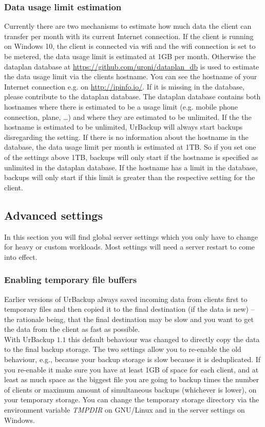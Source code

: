 \documentclass[a4paper,10pt]{article}
\begin{document}
\subsubsection{Data usage limit estimation}
\label{estimate_dataplan}

Currently there are two mechanisms to estimate how much data the client can transfer per month with its current Internet connection. If the client is running on Windows 10, the client is connected via wifi and the wifi connection is set to be metered, the data usage limit is estimated at 1GB per month.
Otherwise the dataplan database at \url{https://github.com/uroni/dataplan_db} is used to estimate the data usage limit via the clients hostname. You can see the hostname of your Internet connection e.g. on \url{http://ipinfo.io/}. If it is missing in the database, please contribute to the dataplan database.
The dataplan database contains both hostnames where there is estimated to be a usage limit (e.g. mobile phone connection, plane, \ldots) and where they are estimated to be unlimited.
If the the hostname is estimated to be unlimited, UrBackup will always start backups disregarding the setting. If there is no information about the hostname in the database, the data usage limit per month is estimated at 1TB. So if you set one of the settings above 1TB, backups will only start if the hostname is specified as unlimited in the dataplan database. If the hostname has a limit in the database, backups will only start if this limit is greater than the respective setting for the client. 

\subsection{Advanced settings}

In this section you will find global server settings which you only have to
change for heavy or custom workloads. Most settings will need a server restart
to come into effect.

\subsubsection{Enabling temporary file buffers}
\label{temp_file_buffers}

Earlier versions of UrBackup always saved incoming data from clients first to temporary
files and then copied it to the final destination (if the data is new) -- the rationale
being, that the final destination may be slow and you want to get the data from the client
as fast as possible.\\
With UrBackup $1.1$ this default behaviour was changed to directly copy the data to the
final backup storage. The two settings allow you to re-enable the old behaviour, e.g.,
because your backup storage is slow because it is deduplicated. If you re-enable it
make sure you have at least 1GB of space for each client, and at least as much space as
the biggest file you are going to backup times the number of clients or maximum amount of simultaneous backups (whichever is lower), on your temporary storage. You can change the temporary storage directory via the environment variable \textsl{TMPDIR} on GNU/Linux and in the server settings on Windows.
\end{document}
